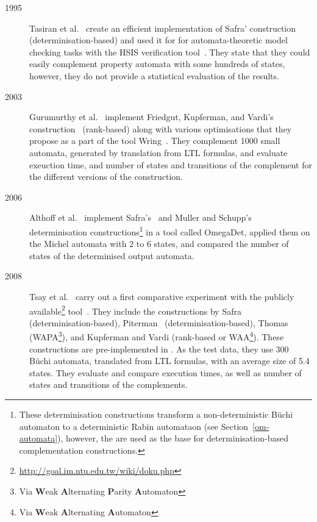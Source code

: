 \begin{description}
\item[1995] Tasiran et al.~\cite{1995_tasiran} create an efficient implementation of Safra' construction\cite{1988_safra_2} (determinisation-based) and used it for for automata-theoretic model checking tasks with the HSIS verification tool~\cite{1994_hsis}. They state that they could easily complement property automata with some hundreds of states, however, they do not provide a statistical evaluation of the results.

\item[2003] Gurumurthy et al.~\cite{2003_Gurumurthy} implement Friedgut, Kupferman, and Vardi's construction~\cite{Kupferman:2001} (rank-based) along with various optimisations that they propose as a part of the tool Wring~\cite{somenzi2000efficient}. They complement 1000 small automata, generated by translation from LTL formulas, and evaluate exeuction time, and number of states and transitions of the complement for the different versions of the construction.

\item[2006] Althoff et al.~\cite{2006_althoff} implement Safra's~\cite{1988_safra_2} and Muller and Schupp's~\cite{Muller199569} determinisation constructions\footnote{These determinisation constructions transform a non-deterministic Büchi automaton to a deterministic Rabin automataon (see Section~\ref{om-automata}), however, the are used as the base for determinisation-based complementation constructions.} in a tool called OmegaDet, applied them on the Michel automata with 2 to 6 states, and compared the number of states of the determinised output automata.

\item[2008] Tsay et al.~\cite{2008_goal_ext} carry out a first comparative experiment with the publicly available\footnote{\url{http://goal.im.ntu.edu.tw/wiki/doku.php}} \goal{} tool~\cite{2007_goal}\cite{2008_goal_ext}\cite{2009_goal}\cite{2013_goal}. They include the constructions by Safra~\cite{1988_safra_2} (determinisation-based), Piterman~\cite{2007_piterman} (determinisation-based), Thomas~\cite{1999_thomas} (WAPA\footnote{Via \textbf{W}eak \textbf{A}lternating \textbf{P}arity \textbf{A}utomaton}), and Kupferman and Vardi\cite{Kupferman:2001} (rank-based or WAA\footnote{Via \textbf{W}eak \textbf{A}lternating \textbf{A}utomaton}). These constructions are pre-implemented in \goal. As the test data, they use 300 Büchi automata, translated from LTL formulas, with an average size of 5.4 states. They evaluate and compare execution times, as well as number of states and transitions of the complements.


\end{description}
